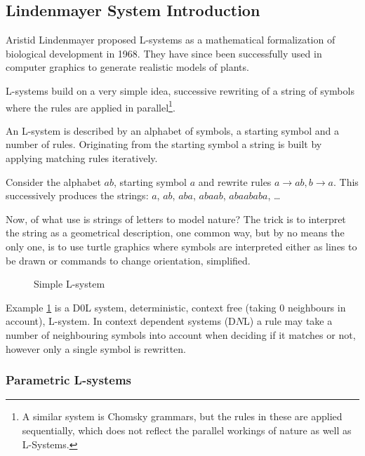 \subsection{Lindenmayer System Introduction}

\label{lindenmayer}

    Aristid Lindenmayer proposed L-systems as a mathematical
    formalization of biological development in 1968. They have since
    been successfully used in computer graphics to generate realistic
    models of plants. 

    L-systems build on a very simple idea, successive rewriting of a
    string of symbols where the rules are applied in
    parallel\footnote{A similar system is Chomsky grammars, but the
    rules in these are applied sequentially, which does not reflect
    the parallel workings of nature as well as L-Systems.}.

    An L-system is described by an alphabet of symbols, a starting
    symbol and a number of rules. Originating from the starting symbol
    a string is built by applying matching rules iteratively.

    Consider the alphabet ${ab}$, starting symbol $a$ and rewrite
    rules ${a\rightarrow ab, b\rightarrow a}$. This successively produces the strings: 
    $a$, $ab$, $aba$, $abaab$, $abaababa$, \ldots 

    Now, of what use is strings of letters to model nature?
    The trick is to interpret the string as a geometrical description,
    one common way, but by no means the only one, is to use turtle graphics
    where symbols are interpreted either as lines to be
    drawn or commands to change orientation, simplified.

\begin{figure}[h]
\centering
\caption{Simple L-system }
\label{lsys-example}
\end{figure}
    
    Example \ref{lsys-example} is a D0L system, deterministic, context free
    (taking 0 neighbours in account), L-system. In context dependent
    systems (D$N$L) a rule may take a number of neighbouring symbols
    into account when deciding if it matches or not, however only a
    single symbol is rewritten.


\subsubsection{Parametric L-systems}

\label{param_l_system}

